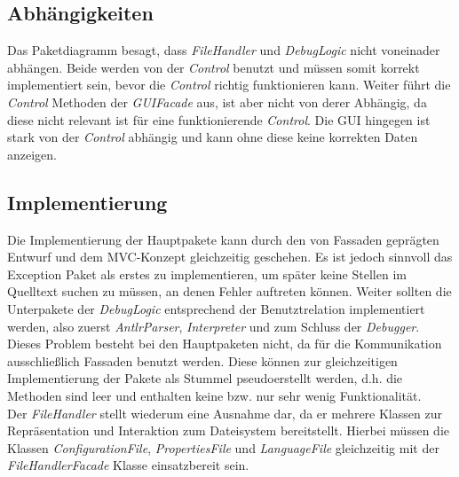 \documentclass[parskip=full]{scrartcl}
\begin{document}
\subsection{Abhängigkeiten}
Das Paketdiagramm besagt, dass \textit{FileHandler} und \textit{DebugLogic} nicht voneinader abhängen.
Beide werden von der \textit{Control} benutzt und müssen somit korrekt implementiert sein, bevor die \textit{Control} richtig funktionieren kann. 
Weiter führt die \textit{Control} Methoden der \textit{GUIFacade} aus, ist aber nicht von derer Abhängig, da diese nicht relevant ist für eine funktionierende \textit{Control}.
Die GUI hingegen ist stark von der \textit{Control} abhängig und kann ohne diese keine korrekten Daten anzeigen.

\subsection{Implementierung}
Die Implementierung der Hauptpakete kann durch den von Fassaden geprägten Entwurf und dem MVC-Konzept gleichzeitig geschehen. 
Es ist jedoch sinnvoll das Exception Paket als erstes zu implementieren, um später keine Stellen im Quelltext suchen zu müssen, an denen Fehler auftreten können.
Weiter sollten die Unterpakete der \textit{DebugLogic} entsprechend der Benutztrelation implementiert werden, also zuerst \textit{AntlrParser}, \textit{Interpreter} und zum Schluss der \textit{Debugger}.
Dieses Problem besteht bei den Hauptpaketen nicht, da für die Kommunikation ausschließlich Fassaden benutzt werden. 
Diese können zur gleichzeitigen Implementierung der Pakete als Stummel pseudoerstellt werden, d.h. die Methoden sind leer und enthalten keine bzw. nur sehr wenig Funktionalität.\\
Der \textit{FileHandler} stellt wiederum eine Ausnahme dar, da er mehrere Klassen zur Repräsentation und Interaktion zum Dateisystem bereitstellt.
Hierbei müssen die Klassen \textit{ConfigurationFile}, \textit{PropertiesFile} und \textit{LanguageFile} gleichzeitig mit der \textit{FileHandlerFacade} Klasse einsatzbereit sein.

\begin{center}
\end{center}
\end{document}
